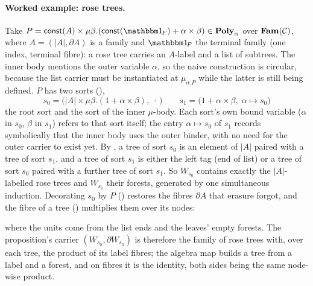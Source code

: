 \paragraph{Worked example: rose trees.}
Take $P = \const(A) \times \mu\beta.(\const(\One_{\!F}) + \alpha \times \beta) \in
\Poly_{\alpha}$ over $\mathbf{Fam}(\mathcal{C})$, where $A = (|A|, \partial A)$ is a family and $\One_{\!F}$ the
terminal family (one index, terminal fibre): a rose tree carries an $A$-label and a list of subtrees.
The inner body mentions the outer variable $\alpha$, so
the naive construction is circular, because the list carrier must be instantiated at $\mu_{\alpha.P}$
while the latter is still being defined. $P$ has two sorts (),
\[
  s_0 = \bigl(|A| \times \mu\beta.(1 + \alpha \times \beta),\; \cdot\,\bigr) \qquad
  s_1 = \bigl(1 + \alpha \times \beta,\; \alpha \mapsto s_0\bigr)
\]
the root sort and the sort of the inner $\mu$-body. Each sort's own bound variable ($\alpha$
in $s_0$, $\beta$ in $s_1$) refers to that sort itself; the entry $\alpha \mapsto s_0$ of $s_1$
records symbolically that the inner body uses the outer binder, with no need for the outer carrier
to exist yet. By , a tree of sort $s_0$ is an element of $|A|$ paired
with a tree of sort $s_1$, and a tree of sort $s_1$ is either the left tag (end of list) or a tree
of sort $s_0$ paired with a further tree of sort $s_1$. So $W_{s_0}$ contains exactly the
$|A|$-labelled rose trees and $W_{s_1}$ their forests, generated by one simultaneous induction.
Decorating $s_0$ by $P$
() restores the fibres $\partial A$ that erasure forgot, and the
fibre of a tree () multiplies them over its nodes:
\begin{center}
\qquad{}
\end{center}
\noindent
where the units come from the list ends and the leaves' empty forests. The proposition's
carrier $(W_{s_0}, \partial W_{s_0})$ is therefore the family of rose trees with, over each tree,
the product of its label fibres; the algebra map builds a tree from a label and a forest, and on
fibres it is the identity, both sides being the same node-wise product.

